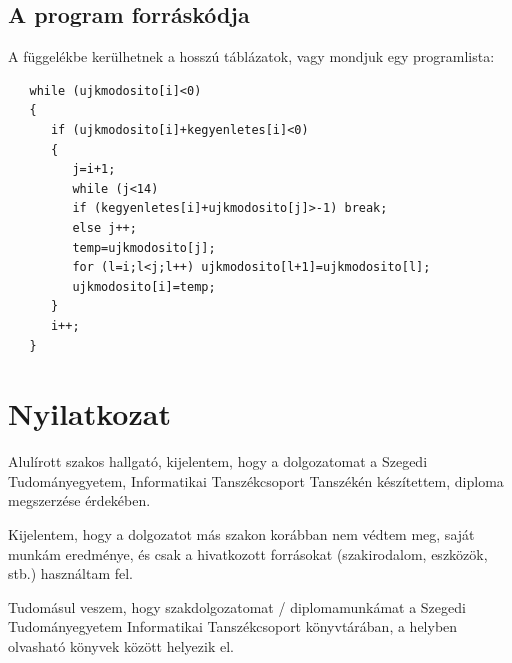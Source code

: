 \documentclass[12pt]{report}
\theoremstyle{definition}
\begin{document}
\section{A program forráskódja}
A függelékbe kerülhetnek a hosszú táblázatok, vagy mondjuk egy programlista:
\begin{verbatim}
   while (ujkmodosito[i]<0)
   {
      if (ujkmodosito[i]+kegyenletes[i]<0)
      {
         j=i+1;
         while (j<14)
         if (kegyenletes[i]+ujkmodosito[j]>-1) break;
         else j++;
         temp=ujkmodosito[j];
         for (l=i;l<j;l++) ujkmodosito[l+1]=ujkmodosito[l];
         ujkmodosito[i]=temp;
      }
      i++;
   }
\end{verbatim}


\chapter*{Nyilatkozat}




\noindent
Alulírott \makebox[4cm]{\dotfill} szakos hallgató, kijelentem, hogy a dolgozatomat a Szegedi Tudományegyetem, Informatikai Tanszékcsoport \makebox[4cm]{\dotfill} Tanszékén készítettem, \makebox[4cm]{\dotfill} diploma megszerzése érdekében.

Kijelentem, hogy a dolgozatot más szakon korábban nem védtem meg, saját munkám eredménye, és csak a hivatkozott forrásokat (szakirodalom, eszközök, stb.) használtam fel.

Tudomásul veszem, hogy szakdolgozatomat / diplomamunkámat a Szegedi Tudományegyetem Informatikai Tanszékcsoport könyvtárában, a helyben olvasható könyvek között helyezik el.

\vspace*{2cm}
\end{document}
